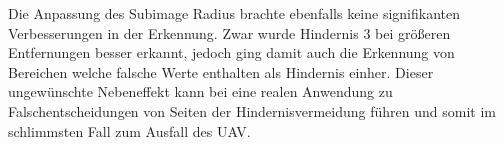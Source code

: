 
\noindent
Die Anpassung des Subimage Radius brachte ebenfalls keine signifikanten Verbesserungen in der Erkennung. Zwar wurde Hindernis 3 bei größeren Entfernungen besser erkannt, jedoch ging damit auch die Erkennung von Bereichen welche falsche Werte enthalten als Hindernis einher. Dieser ungewünschte Nebeneffekt kann bei eine realen Anwendung zu Falschentscheidungen von Seiten der Hindernisvermeidung führen und somit im schlimmsten Fall zum Ausfall des UAV. 